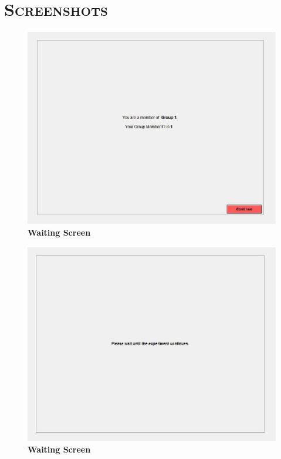 \documentclass[12pt]{article}
\begin{document}
\thispagestyle{empty}


\section*{\scshape Screenshots}

\centering
\begin{figure}[H]
\includegraphics[width=40pc]{sorting2}
\caption*{\bf Waiting Screen}
\end{figure}

\newpage

\centering
\begin{figure}[H]
\includegraphics[width=40pc]{waitingscreen}
\caption*{\bf Waiting Screen}
\end{figure}
\end{document}
